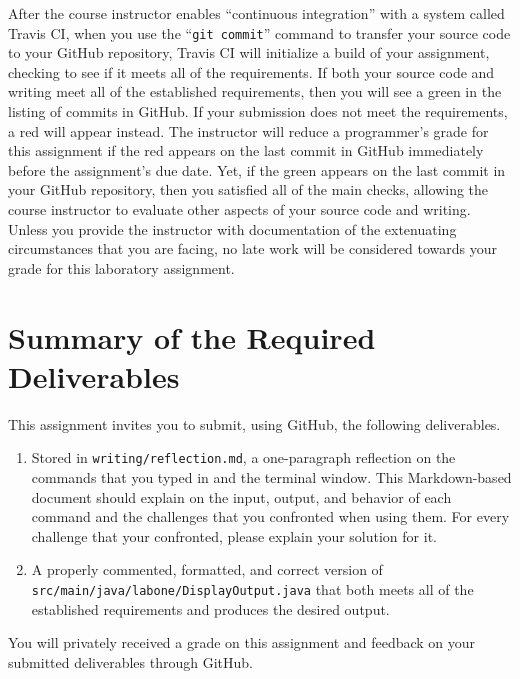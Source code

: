 \documentclass[11pt]{article}
\newcommand{\mainprogramsource}{\lstinline{src/main/java/labone/DisplayOutput.java}}
\newcommand{\reflection}{\lstinline{writing/reflection.md}}
\newcommand{\gitcommit}{\command{git commit}}
\newcommand{\command}[1]{``\lstinline{#1}''}
\newcommand{\step}[1]{``{#1}''}
\newcommand{\checkmark}{\ding{51}}
\newcommand{\naughtmark}{\ding{55}}
\begin{document}
After the course instructor enables \step{continuous integration} with a system called Travis CI, when you use the
\gitcommit{} command to transfer your source code to your GitHub repository, Travis CI will initialize a build of your
assignment, checking to see if it meets all of the requirements. If both your source code and writing meet all of the
established requirements, then you will see a green \checkmark{} in the listing of commits in GitHub. If your submission
does not meet the requirements, a red \naughtmark{} will appear instead. The instructor will reduce a programmer's grade
for this assignment if the red \naughtmark{} appears on the last commit in GitHub immediately before the assignment's
due date. Yet, if the green \checkmark{} appears on the last commit in your GitHub repository, then you satisfied all of
the main checks, allowing the course instructor to evaluate other aspects of your source code and writing. Unless you
provide the instructor with documentation of the extenuating circumstances that you are facing, no late work will be
considered towards your grade for this laboratory assignment.

\section*{Summary of the Required Deliverables}

\noindent
This assignment invites you to submit, using GitHub, the following deliverables.

\begin{enumerate}
  \setlength{\itemsep}{0in}

\item Stored in \reflection{}, a one-paragraph reflection on the commands that you typed in \gvim{} and the terminal
  window. This Markdown-based document should explain on the input, output, and behavior of each command and the
  challenges that you confronted when using them. For every challenge that your confronted, please explain your solution
  for it.

\item A properly commented, formatted, and correct version of \mainprogramsource{} that both meets all of the established
  requirements and produces the desired output.

\end{enumerate}

You will privately received a grade on this assignment and feedback on your submitted deliverables through GitHub.
\end{document}
